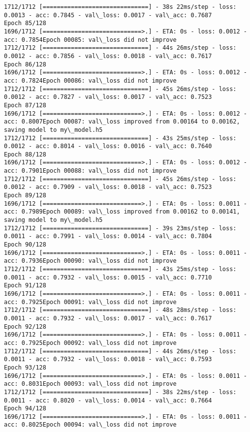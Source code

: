 \documentclass[11pt]{article}
\begin{document}
\begin{Verbatim}[commandchars=\\\{\}]
1712/1712 [==============================] - 38s 22ms/step - loss: 0.0013 - acc: 0.7845 - val\_loss: 0.0017 - val\_acc: 0.7687
Epoch 85/128
1696/1712 [============================>.] - ETA: 0s - loss: 0.0012 - acc: 0.7854Epoch 00085: val\_loss did not improve
1712/1712 [==============================] - 44s 26ms/step - loss: 0.0012 - acc: 0.7856 - val\_loss: 0.0018 - val\_acc: 0.7617
Epoch 86/128
1696/1712 [============================>.] - ETA: 0s - loss: 0.0012 - acc: 0.7824Epoch 00086: val\_loss did not improve
1712/1712 [==============================] - 45s 26ms/step - loss: 0.0012 - acc: 0.7827 - val\_loss: 0.0017 - val\_acc: 0.7523
Epoch 87/128
1696/1712 [============================>.] - ETA: 0s - loss: 0.0012 - acc: 0.8007Epoch 00087: val\_loss improved from 0.00164 to 0.00162, saving model to my\_model.h5
1712/1712 [==============================] - 43s 25ms/step - loss: 0.0012 - acc: 0.8014 - val\_loss: 0.0016 - val\_acc: 0.7640
Epoch 88/128
1696/1712 [============================>.] - ETA: 0s - loss: 0.0012 - acc: 0.7901Epoch 00088: val\_loss did not improve
1712/1712 [==============================] - 45s 26ms/step - loss: 0.0012 - acc: 0.7909 - val\_loss: 0.0018 - val\_acc: 0.7523
Epoch 89/128
1696/1712 [============================>.] - ETA: 0s - loss: 0.0011 - acc: 0.7989Epoch 00089: val\_loss improved from 0.00162 to 0.00141, saving model to my\_model.h5
1712/1712 [==============================] - 39s 23ms/step - loss: 0.0011 - acc: 0.7991 - val\_loss: 0.0014 - val\_acc: 0.7804
Epoch 90/128
1696/1712 [============================>.] - ETA: 0s - loss: 0.0011 - acc: 0.7936Epoch 00090: val\_loss did not improve
1712/1712 [==============================] - 43s 25ms/step - loss: 0.0011 - acc: 0.7932 - val\_loss: 0.0015 - val\_acc: 0.7710
Epoch 91/128
1696/1712 [============================>.] - ETA: 0s - loss: 0.0011 - acc: 0.7925Epoch 00091: val\_loss did not improve
1712/1712 [==============================] - 48s 28ms/step - loss: 0.0011 - acc: 0.7932 - val\_loss: 0.0017 - val\_acc: 0.7617
Epoch 92/128
1696/1712 [============================>.] - ETA: 0s - loss: 0.0011 - acc: 0.7925Epoch 00092: val\_loss did not improve
1712/1712 [==============================] - 44s 26ms/step - loss: 0.0011 - acc: 0.7932 - val\_loss: 0.0018 - val\_acc: 0.7593
Epoch 93/128
1696/1712 [============================>.] - ETA: 0s - loss: 0.0011 - acc: 0.8031Epoch 00093: val\_loss did not improve
1712/1712 [==============================] - 38s 22ms/step - loss: 0.0011 - acc: 0.8020 - val\_loss: 0.0014 - val\_acc: 0.7664
Epoch 94/128
1696/1712 [============================>.] - ETA: 0s - loss: 0.0011 - acc: 0.8025Epoch 00094: val\_loss did not improve

\end{Verbatim}
\end{document}
